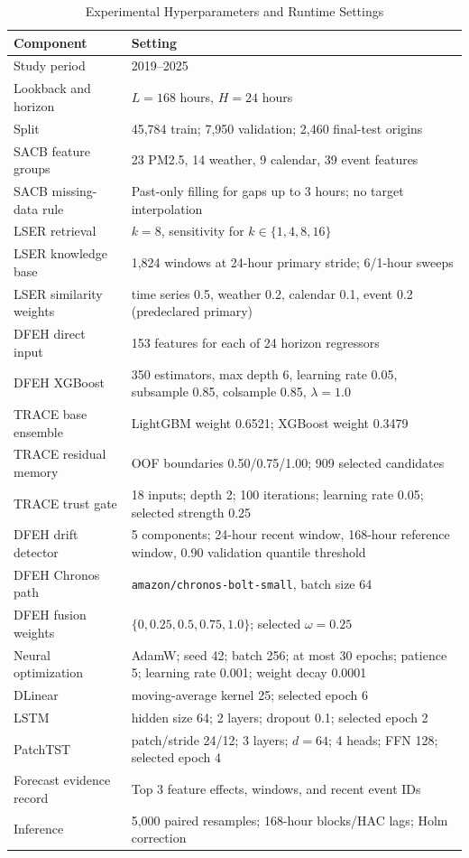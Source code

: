 \documentclass{ieeeaccess}
\begin{document}
\begin{table}[!t]
\centering
\caption{Experimental Hyperparameters and Runtime Settings}
\label{tab:hyperparameters}
\renewcommand{\arraystretch}{0.94}
\begin{tabular}{ll}
\toprule
Component & Setting \\
\midrule
Study period & 2019--2025 \\
Lookback and horizon & $L=168$ hours, $H=24$ hours \\
Split & 45,784 train; 7,950 validation; 2,460 final-test origins \\
SACB feature groups & 23 PM2.5, 14 weather, 9 calendar, 39 event features \\
SACB missing-data rule & Past-only filling for gaps up to 3 hours; no target interpolation \\
LSER retrieval & $k=8$, sensitivity for $k \in \{1,4,8,16\}$ \\
LSER knowledge base & 1,824 windows at 24-hour primary stride; 6/1-hour sweeps \\
LSER similarity weights & time series 0.5, weather 0.2, calendar 0.1, event 0.2 (predeclared primary) \\
DFEH direct input & 153 features for each of 24 horizon regressors \\
DFEH XGBoost & 350 estimators, max depth 6, learning rate 0.05, subsample 0.85,
colsample 0.85, $\lambda=1.0$ \\
TRACE base ensemble & LightGBM weight 0.6521; XGBoost weight 0.3479 \\
TRACE residual memory & OOF boundaries 0.50/0.75/1.00; 909 selected candidates \\
TRACE trust gate & 18 inputs; depth 2; 100 iterations; learning rate 0.05;
selected strength 0.25 \\
DFEH drift detector & 5 components; 24-hour recent window, 168-hour reference window,
0.90 validation quantile threshold \\
DFEH Chronos path & \texttt{amazon/chronos-bolt-small}, batch size 64 \\
DFEH fusion weights & $\{0,0.25,0.5,0.75,1.0\}$; selected $\omega=0.25$ \\
Neural optimization & AdamW; seed 42; batch 256; at most 30 epochs; patience 5;
learning rate 0.001; weight decay 0.0001 \\
DLinear & moving-average kernel 25; selected epoch 6 \\
LSTM & hidden size 64; 2 layers; dropout 0.1; selected epoch 2 \\
PatchTST & patch/stride 24/12; 3 layers; $d=64$; 4 heads; FFN 128; selected epoch 4 \\
Forecast evidence record & Top 3 feature effects, windows, and recent event IDs \\
Inference & 5,000 paired resamples; 168-hour blocks/HAC lags; Holm correction \\
\bottomrule
\end{tabular}
\end{table}
\end{document}
